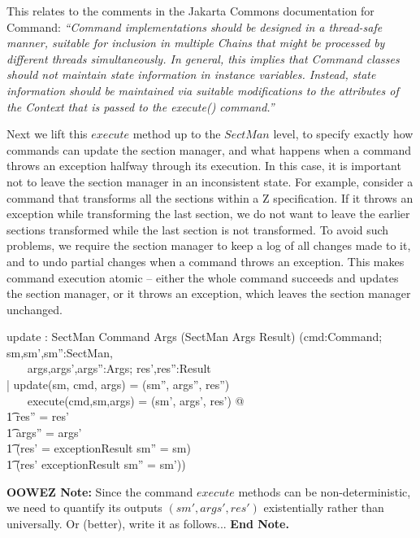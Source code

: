 \documentclass{llncs} %
\newenvironment{OOWEZ}{\textbf{OOWEZ Note: }}{\textbf{End Note.}}
\begin{document}
This relates to the comments in the Jakarta Commons documentation for
Command: \emph{``Command implementations should be designed in a
  thread-safe manner, suitable for inclusion in multiple Chains that might
  be processed by different threads simultaneously. In general, this
  implies that Command classes should not maintain state information in
  instance variables. Instead, state information should be maintained via
  suitable modifications to the attributes of the Context that is passed to
  the execute() command.''}


Next we lift this $execute$ method up to the $SectMan$ level,
to specify exactly how commands can update the section manager,
and what happens when a command throws an exception halfway
through its execution.  In this case, it is important not to
leave the section manager in an inconsistent state.  For example,
consider a command that transforms all the sections within a
Z specification.  If it throws an exception while transforming the
last section, we do not want to leave the earlier sections transformed
while the last section is not transformed.  To avoid such problems, we
require the section manager to keep a log of all changes made to it,
and to undo partial changes when a command throws an exception.
This makes command execution atomic -- either the whole command
succeeds and updates the section manager, or it throws an exception,
which leaves the section manager unchanged.

\begin{axdef}
  update : SectMan \cross Command \cross Args 
       \fun (SectMan \cross Args \cross Result)
\where
  (\forall cmd:Command; sm,sm',sm'':SectMan,\\
  ~~~  args,args',args'':Args; res',res'':Result\\
  | update(sm, cmd, args) = (sm'', args'', res'') \land \\
  ~~~ execute(cmd,sm,args) = (sm', args', res') @ \\
  \t1 res'' = res' \land \\
  \t1 args'' = args' \land \\
  \t1 (res' = exceptionResult \implies sm'' = sm) \land \\
  \t1 (res' \neq exceptionResult \implies sm'' = sm'))
\end{axdef}

\begin{OOWEZ} Since the command $execute$ methods can be
       non-deterministic, we need to quantify its outputs
       $(sm', args', res')$ existentially rather than universally.
       Or (better), write it as follows...
\end{OOWEZ}
\end{document}
